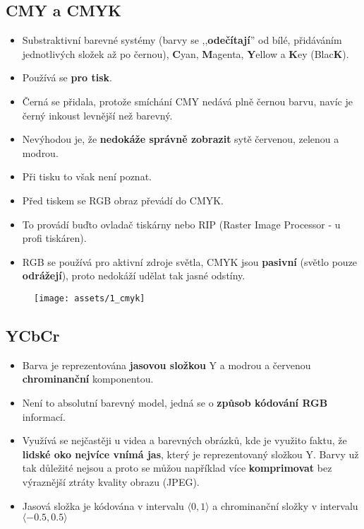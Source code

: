 \subsection{CMY a CMYK}
\begin{itemize}
    \item Substraktivní barevné systémy (barvy se ,,\textbf{odečítají}'' od bílé, přidáváním jednotlivých složek až po černou), \textbf{C}yan, \textbf{M}agenta, \textbf{Y}ellow a \textbf{K}ey (Blac\textbf{K}).
    \item Používá se \textbf{pro tisk}.
    \item Černá se přidala, protože smíchání CMY nedává plně černou barvu, navíc je černý inkoust levnější než barevný.
    \item Nevýhodou je, že \textbf{nedokáže správně zobrazit} sytě červenou, zelenou a modrou.
    \item Při tisku to však není poznat.
    \item Před tiskem se RGB obraz převádí do CMYK.
    \item To provádí buďto ovladač tiskárny nebo RIP (Raster Image Processor - u profi tiskáren).
    \item RGB se používá pro aktivní zdroje světla, CMYK jsou \textbf{pasivní} (světlo pouze \textbf{odrážejí}), proto nedokáží udělat tak jasné odstíny.
\end{itemize}
\begin{figure}[H]
    \centering
    \texttt{[image: assets/1\_cmyk]}
\end{figure}

\subsection{YCbCr}
\begin{itemize}
    \item Barva je reprezentována \textbf{jasovou složkou} Y a modrou a červenou \textbf{chrominanční} komponentou.
    \item Není to absolutní barevný model, jedná se o \textbf{způsob kódování RGB} informací.
    \item Využívá se nejčastěji u videa a barevných obrázků, kde je využito faktu, že \textbf{lidské oko nejvíce vnímá jas}, který je reprezentovaný složkou Y. Barvy už tak důležité nejsou a proto se můžou například více \textbf{komprimovat} bez výraznější ztráty kvality obrazu (JPEG).
    \item Jasová složka je kódována v intervalu $\langle0, 1\rangle$ a chrominanční složky v intervalu $\langle-0.5, 0.5\rangle$
\end{itemize}